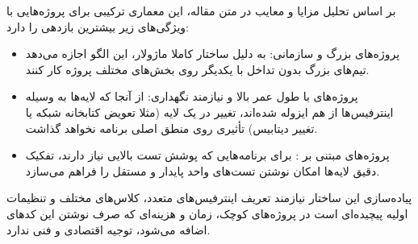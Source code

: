 بر اساس تحلیل مزایا و معایب در متن مقاله، این معماری ترکیبی برای پروژه‌هایی با ویژگی‌های زیر بیشترین بازدهی را دارد:

\begin{itemize}
    \item {پروژه‌های بزرگ و سازمانی:} به دلیل ساختار کاملا ماژولار، این الگو اجازه می‌دهد تیم‌های بزرگ بدون تداخل با یکدیگر روی بخش‌های مختلف پروژه کار کنند.
    \item {پروژه‌های با طول عمر بالا و نیازمند نگهداری:} از آنجا که لایه‌ها به وسیله اینترفیس‌ها از هم ایزوله شده‌اند، تغییر در یک لایه (مثلا تعویض کتابخانه شبکه یا تغییر دیتابیس) تأثیری روی منطق اصلی برنامه نخواهد گذاشت.
    \item {پروژه‌های مبتنی بر :} برای برنامه‌هایی که پوشش تست بالایی نیاز دارند، تفکیک دقیق لایه‌ها امکان نوشتن تست‌های واحد پایدار و مستقل را فراهم می‌سازد.
\end{itemize}

پیاده‌سازی این ساختار نیازمند تعریف اینترفیس‌های متعدد، کلاس‌های مختلف و تنظیمات اولیه پیچیده‌ای است در پروژه‌های کوچک، زمان و هزینه‌ای که صرف نوشتن این کدهای اضافه می‌شود، توجیه اقتصادی و فنی ندارد.